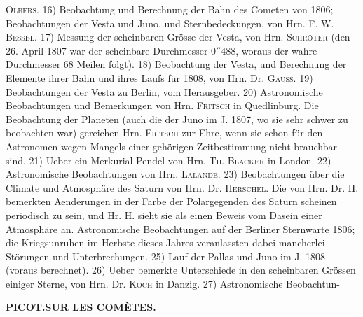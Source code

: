 \textsc{Olbers}. 16) Beobachtung und Berechnung der Bahn des Cometen von 1806; Beobachtungen der Vesta und Juno, und Sternbedeckungen, von Hrn. F. W. \textsc{Bessel}. 17) Messung der scheinbaren Grösse der Vesta, von Hrn. \textsc{Schröter} (den 26. April 1807 war der scheinbare Durchmesser $0''488$, woraus der wahre Durchmesser 68 Meilen folgt). 18) Beobachtung der Vesta, und Berechnung der Elemente ihrer Bahn und ihres Laufs für 1808, von Hrn. Dr. \textsc{Gauss}. 19) Beobachtungen der Vesta zu Berlin, vom Herausgeber. 20) Astronomische Beobachtungen und Bemerkungen von Hrn. \textsc{Fritsch} in Quedlinburg. Die Beobachtung der Planeten (auch die der Juno im J. 1807, wo sie sehr schwer zu beobachten war) gereichen Hrn. \textsc{Fritsch} zur Ehre, wenn sie schon für den Astronomen wegen Mangels einer gehörigen Zeitbestimmung nicht brauchbar sind. 21) Ueber ein Merkurial-Pendel von Hrn. \textsc{Th. Blacker} in London. 22) Astronomische Beobachtungen von Hrn. \textsc{Lalande}. 23) Beobachtungen über die Climate und Atmosphäre des Saturn von Hrn. Dr. \textsc{Herschel}. Die von Hrn. Dr. H. bemerkten Aenderungen in der Farbe der Polargegenden des Saturn scheinen periodisch zu sein, und Hr. H. sieht sie als einen Beweis vom Dasein einer Atmosphäre an. Astronomische Beobachtungen auf der Berliner Sternwarte 1806; die Kriegsunruhen im Herbste dieses Jahres veranlassten dabei mancherlei Störungen und Unterbrechungen. 25) Lauf der Pallas und Juno im J. 1808 (voraus berechnet). 26) Ueber bemerkte Unterschiede in den scheinbaren Grössen einiger Sterne, von Hrn. Dr. \textsc{Koch} in Danzig. 27) Astronomische Beobachtun-\par
\clearpage
\endgroup
\begingroup
\pagestyle{empty}
\thispagestyle{empty}
\noindent{}%
\makebox[12mm][l]{{}}%
\parbox[t]{\dimexpr\linewidth-24mm\relax}{\centering\footnotesize\bfseries PICOT.\enspace SUR LES COMÈTES.\par}%
\par\medskip
